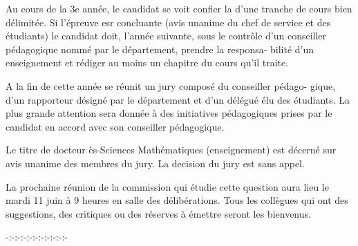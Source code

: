 Au cours de la 3e année, le candidat se voit confier la 
d'une tranche de cours bien délimitée. Si l'épreuve esr concluante (avis unanime
du chef de service et des étudiants) le candidat doit, l'année suivante, sous le
contrôle d'un conseiller pédagogique nommé par le département, prendre la responsa-%
bilité d'un enseignement et rédiger au moins un chapitre du cours qu'il traite.

A la fin de cette année se réunit un jury composé du conseiller pédago-%
gique, d'un rapporteur désigné par le département et d'un délégué élu des étudiants.
La plus grande attention sera donnée à des initiatives pédagogiques prises par le
candidat en accord avec son conseiller pédagogique.

Le titre de docteur ès-Sciences Mathématiques (enseignement) est décerné
sur avis unanime des membres du jury. La decision du jury est sans appel.

La prochaine réunion de la commission qui étudie cette question aura
lieu le mardi 11 juin à 9 heures en salle des délibérations. Tous les collègues
qui ont des suggestions, des critiques ou des réserves à émettre seront les
bienvenus.

-:-:-:-:-:-:-:-:-:-:-

 



 



 



